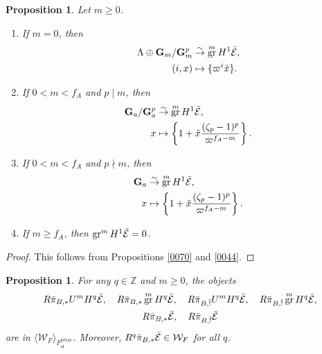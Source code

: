 \documentclass{amsart}
\newtheorem{Prop}[Thm]{Proposition}
\theoremstyle{remark}
\numberwithin{equation}{subsection}
\newcommand{\isomto}{\overset{\sim}{\to}}
\newcommand{\Z}{\mathbb{Z}}
\newcommand{\et}{\mathrm{et}}
\newcommand{\Gm}{\mathbf{G}_{m}}
\newcommand{\Ga}{\mathbf{G}_{a}}
\newcommand{\perar}{\mathrm{perar}}
\newcommand{\genby}[1]{\langle #1 \rangle}
\DeclareMathOperator{\gr}{gr}
\begin{document}
\begin{Prop} \label{0234}
	Let $m \ge 0$.
	\begin{enumerate}
		\item \label{0235}
			If $m = 0$, then
				\begin{align*}
							\Lambda \oplus \Gm / \Gm^{p}
					&	\isomto
							\gr^{m} H^{1} \Bar{\mathcal{E}},
					\\
							(i, x)
					&	\mapsto
							\{\varpi^{i} \Tilde{x}\}.
				\end{align*}
		\item \label{0236}
			If $0 < m < f_{A}$ and $p \mid m$, then
				\begin{align*}
							\Ga / \Ga^{p}
					&	\isomto
							\gr^{m} H^{1} \Bar{\mathcal{E}},
					\\
							x
					&	\mapsto
							\left\{
									1
								+
									\Tilde{x}
									\frac{
										(\zeta_{p} - 1)^{p}
									}{
										\varpi^{f_{A} - m}
									}
							\right\}.
				\end{align*}
		\item \label{0237}
			If $0 < m < f_{A}$ and $p \nmid m$, then
				\begin{align*}
							\Ga
					&	\isomto
							\gr^{m} H^{1} \Bar{\mathcal{E}},
					\\
							x
					&	\mapsto
							\left\{
								1 + \Tilde{x} \frac{(\zeta_{p} - 1)^{p}}{\varpi^{f_{A} - m}}
							\right\}.
				\end{align*}
		\item \label{0238}
			If $m \ge f_{A}$, then $\gr^{m} H^{1} \Bar{\mathcal{E}} = 0$.
	\end{enumerate}
\end{Prop}

\begin{proof}
	This follows from
	Propositions \ref{0070} and \ref{0044}.
\end{proof}

\begin{Prop} \label{0249}
	For any $q \in \Z$ and $m \ge 0$,
	the objects
		\begin{gather*}
				R \Bar{\pi}_{B, \ast} U^{m} H^{q} \Bar{\mathcal{E}}, \quad
				R \Bar{\pi}_{B, \ast} \gr^{m} H^{q} \Bar{\mathcal{E}}, \quad
				R \Bar{\pi}_{B, \Hat{!}} U^{m} H^{q} \Bar{\mathcal{E}}, \quad
				R \Bar{\pi}_{B, \Hat{!}} \gr^{m} H^{q} \Bar{\mathcal{E}},
			\\
				R \Bar{\pi}_{B, \ast} \Bar{\mathcal{E}}, \quad
				R \Bar{\pi}_{B, \Hat{!}} \Bar{\mathcal{E}}
		\end{gather*}
	are in $\genby{\mathcal{W}_{F}}_{F^{\perar}_{\et}}$.
	Moreover, $R^{q} \Bar{\pi}_{B, \ast} \Bar{\mathcal{E}} \in \mathcal{W}_{F}$ for all $q$.
\end{Prop}
\end{document}
